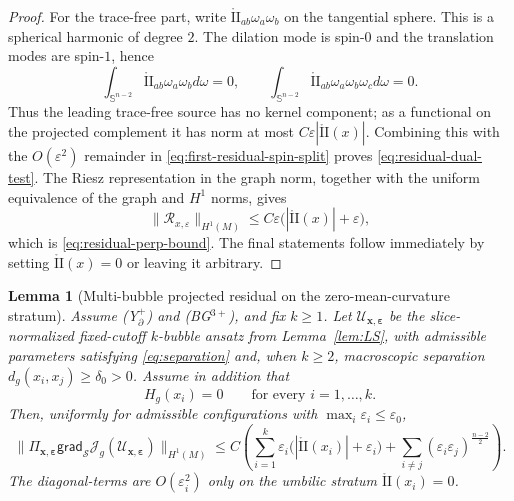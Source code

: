 \documentclass[11pt,reqno,a4paper]{amsart}
\numberwithin{equation}{section}
\theoremstyle{plain}
\newtheorem{lemma}[theorem]{Lemma}
\theoremstyle{remark}
\theoremstyle{plain}
\begin{document}
\begin{proof}
For the trace-free part, write
$\mathring{\mathrm{II}}_{ab}\omega_a\omega_b$ on the tangential sphere.  This is a spherical
harmonic of degree $2$.  The dilation mode is spin-$0$ and the translation modes are
spin-$1$, hence
\[
\int_{\mathbb S^{n-2}}\mathring{\mathrm{II}}_{ab}\omega_a\omega_bd\omega=0,
\qquad
\int_{\mathbb S^{n-2}}\mathring{\mathrm{II}}_{ab}\omega_a\omega_b\omega_cd\omega=0.
\]
Thus the leading trace-free source has no kernel component; as a functional on the projected
complement it has norm at most $C\varepsilon|\mathring{\mathrm{II}}(x)|$.  Combining this with
the $O(\varepsilon^2)$ remainder in \eqref{eq:first-residual-spin-split} proves
\eqref{eq:residual-dual-test}.  The Riesz representation in the graph norm, together with the
uniform equivalence of the graph and $H^1$ norms, gives
\[
\|\mathcal R_{x,\varepsilon}\|_{H^1(M)}
\le C\varepsilon\bigl(|\mathring{\mathrm{II}}(x)|+\varepsilon\bigr),
\]
which is \eqref{eq:residual-perp-bound}.  The final statements follow immediately by setting
$\mathring{\mathrm{II}}(x)=0$ or leaving it arbitrary.
\end{proof}

\begin{lemma}[Multi-bubble projected residual on the zero-mean-curvature stratum]
\label{lem:multibubble-project-residual-H0}
Assume \textup{(Y$^+_{\partial}$)} and \textup{(BG$^{3+}$)}, and fix $k\ge1$.
Let $\mathcal U_{\mathbf x,\boldsymbol\varepsilon}$ be the slice-normalized fixed-cutoff $k$-bubble ansatz from Lemma~\ref{lem:LS},
with admissible parameters satisfying \eqref{eq:separation} and, when $k\ge2$,
macroscopic separation $d_g(x_i,x_j)\ge\delta_0>0$.
Assume in addition that
\[
H_g(x_i)=0\qquad\text{for every }i=1,\dots,k.
\]
Then, uniformly for admissible configurations with $\max_i\varepsilon_i\le\varepsilon_0$,
\begin{equation}\label{eq:multibubble-residual-H0}
\big\|\Pi_{\mathbf x,\boldsymbol\varepsilon}
\mathsf{grad}_{\mathcal S}\mathcal J_g(\mathcal U_{\mathbf x,\boldsymbol\varepsilon})\big\|_{H^1(M)}
\le
C\left(
\sum_{i=1}^k \varepsilon_i\big(|\mathring{\mathrm{II}}(x_i)|+\varepsilon_i\big)
+
\sum_{i\neq j}
(\varepsilon_i\varepsilon_j)^{\frac{n-2}{2}}
\right).
\end{equation}
The diagonal-terms are $O(\varepsilon_i^2)$ only on the umbilic stratum
$\mathring{\mathrm{II}}(x_i)=0$.
\end{lemma}
\end{document}
